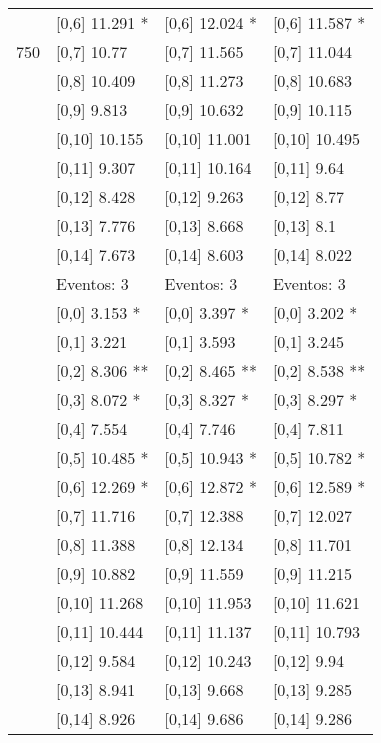 \begin{table}
\begin{tabular}[t]{llll}
 & {}[0,6] 11.291 * & {}[0,6] 12.024 * & {}[0,6] 11.587 *\\
750 & {}[0,7] 10.77 & {}[0,7] 11.565 & {}[0,7] 11.044\\
\addlinespace
 & {}[0,8] 10.409 & {}[0,8] 11.273 & {}[0,8] 10.683\\
 & {}[0,9] 9.813 & {}[0,9] 10.632 & {}[0,9] 10.115\\
 & {}[0,10] 10.155 & {}[0,10] 11.001 & {}[0,10] 10.495\\
 & {}[0,11] 9.307 & {}[0,11] 10.164 & {}[0,11] 9.64\\
 & {}[0,12] 8.428 & {}[0,12] 9.263 & {}[0,12] 8.77\\
\addlinespace
 & {}[0,13] 7.776 & {}[0,13] 8.668 & {}[0,13] 8.1\\
 & {}[0,14] 7.673 & {}[0,14] 8.603 & {}[0,14] 8.022\\
 & Eventos:  3 & Eventos:  3 & Eventos:  3\\
 & {}[0,0] 3.153 * & {}[0,0] 3.397 * & {}[0,0] 3.202 *\\
 & {}[0,1] 3.221 & {}[0,1] 3.593 & {}[0,1] 3.245\\
\addlinespace
 & {}[0,2] 8.306 ** & {}[0,2] 8.465 ** & {}[0,2] 8.538 **\\
 & {}[0,3] 8.072 * & {}[0,3] 8.327 * & {}[0,3] 8.297 *\\
 & {}[0,4] 7.554 & {}[0,4] 7.746 & {}[0,4] 7.811\\
 & {}[0,5] 10.485 * & {}[0,5] 10.943 * & {}[0,5] 10.782 *\\
 & {}[0,6] 12.269 * & {}[0,6] 12.872 * & {}[0,6] 12.589 *\\
\addlinespace
1000 & {}[0,7] 11.716 & {}[0,7] 12.388 & {}[0,7] 12.027\\
 & {}[0,8] 11.388 & {}[0,8] 12.134 & {}[0,8] 11.701\\
 & {}[0,9] 10.882 & {}[0,9] 11.559 & {}[0,9] 11.215\\
 & {}[0,10] 11.268 & {}[0,10] 11.953 & {}[0,10] 11.621\\
 & {}[0,11] 10.444 & {}[0,11] 11.137 & {}[0,11] 10.793\\
\addlinespace
 & {}[0,12] 9.584 & {}[0,12] 10.243 & {}[0,12] 9.94\\
 & {}[0,13] 8.941 & {}[0,13] 9.668 & {}[0,13] 9.285\\
 & {}[0,14] 8.926 & {}[0,14] 9.686 & {}[0,14] 9.286\\
\bottomrule
\end{tabular}
\end{table}
